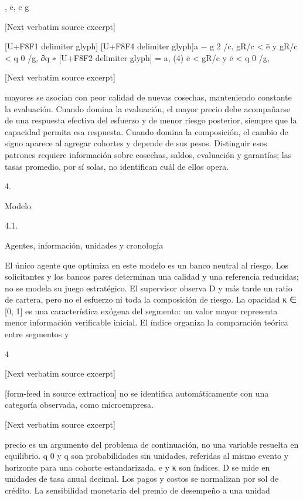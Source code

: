 \documentclass[10pt]{article}
\begin{document}
\begin{ReviewVerbatim}

, ē,
c
g

[Next verbatim source excerpt]

[U+F8F1 delimiter glyph]
[U+F8F4 delimiter glyph]a − g 2 /c, gR/c < ē y gR/c < q 0 /g,
∂q ∗ [U+F8F2 delimiter glyph]
= a,
(4)
ē < gR/c y ē < q 0 /g,

[Next verbatim source excerpt]

mayores se asocian con peor calidad de nuevas cosechas, manteniendo constante la evaluación.
Cuando domina la evaluación, el mayor precio debe acompañarse de una respuesta efectiva del
esfuerzo y de menor riesgo posterior, siempre que la capacidad permita esa respuesta. Cuando
domina la composición, el cambio de signo aparece al agregar cohortes y depende de sus pesos.
Distinguir esos patrones requiere información sobre cosechas, saldos, evaluación y garantías; las
tasas promedio, por sí solas, no identiﬁcan cuál de ellos opera.

4.

Modelo

4.1.

Agentes, información, unidades y cronología

El único agente que optimiza en este modelo es un banco neutral al riesgo. Los solicitantes y los
bancos pares determinan una calidad y una referencia reducidas; no se modela su juego estratégico.
El supervisor observa D y más tarde un ratio de cartera, pero no el esfuerzo ni toda la composición de
riesgo. La opacidad κ ∈ [0, 1] es una característica exógena del segmento: un valor mayor representa
menor información veriﬁcable inicial. El índice organiza la comparación teórica entre segmentos y

4

[Next verbatim source excerpt]



[form-feed in source extraction]
no se identiﬁca automáticamente con una categoría observada, como microempresa.

[Next verbatim source excerpt]

precio es un argumento del problema de continuación, no una variable resuelta en equilibrio.
q 0 y q son probabilidades sin unidades, referidas al mismo evento y horizonte para una cohorte
estandarizada. e y κ son índices. D se mide en unidades de tasa anual decimal. Los pagos y costos
se normalizan por sol de crédito. La sensibilidad monetaria del premio de desempeño a una unidad


\end{ReviewVerbatim}
\end{document}
